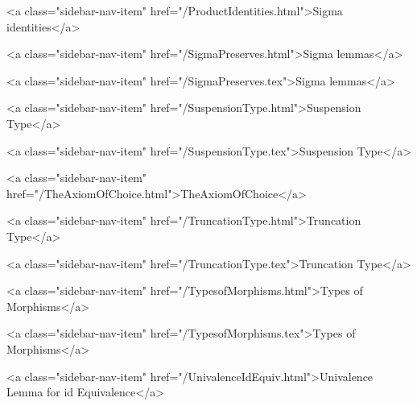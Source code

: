           <a class="sidebar-nav-item" href="/ProductIdentities.html">Sigma identities</a>
        
      
    
      
        
          <a class="sidebar-nav-item" href="/SigmaPreserves.html">Sigma lemmas</a>
        
      
    
      
        
          <a class="sidebar-nav-item" href="/SigmaPreserves.tex">Sigma lemmas</a>
        
      
    
      
        
          <a class="sidebar-nav-item" href="/SuspensionType.html">Suspension Type</a>
        
      
    
      
        
          <a class="sidebar-nav-item" href="/SuspensionType.tex">Suspension Type</a>
        
      
    
      
        
          <a class="sidebar-nav-item" href="/TheAxiomOfChoice.html">TheAxiomOfChoice</a>
        
      
    
      
        
          <a class="sidebar-nav-item" href="/TruncationType.html">Truncation Type</a>
        
      
    
      
        
          <a class="sidebar-nav-item" href="/TruncationType.tex">Truncation Type</a>
        
      
    
      
        
          <a class="sidebar-nav-item" href="/TypesofMorphisms.html">Types of Morphisms</a>
        
      
    
      
        
          <a class="sidebar-nav-item" href="/TypesofMorphisms.tex">Types of Morphisms</a>
        
      
    
      
        
          <a class="sidebar-nav-item" href="/UnivalenceIdEquiv.html">Univalence Lemma for id Equivalence</a>
        
      
    
